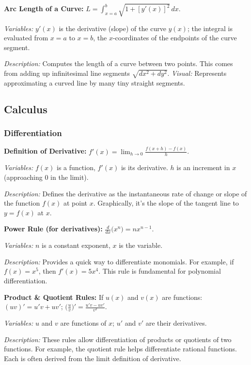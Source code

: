 \documentclass{article}
\begin{document}
\textbf{Arc Length of a Curve:} $L = \displaystyle \int_{x=a}^{b} \sqrt{1 + [y'(x)]^2}\,dx$.

\textit{Variables:} $y'(x)$ is the derivative (slope) of the curve $y(x)$; the integral is evaluated from $x=a$ to $x=b$, the $x$-coordinates of the endpoints of the curve segment.

\textit{Description:} Computes the length of a curve between two points. This comes from adding up infinitesimal line segments $\sqrt{dx^2+dy^2}$. \textit{Visual:} Represents approximating a curved line by many tiny straight segments.

\subsection*{Calculus}

\subsubsection*{Differentiation}

\textbf{Definition of Derivative:} $f'(x) = \displaystyle \lim_{h \to 0} \frac{f(x+h) - f(x)}{h}$.

\textit{Variables:} $f(x)$ is a function, $f'(x)$ is its derivative. $h$ is an increment in $x$ (approaching 0 in the limit).

\textit{Description:} Defines the derivative as the instantaneous rate of change or slope of the function $f(x)$ at point $x$. Graphically, it’s the slope of the tangent line to $y=f(x)$ at $x$.

\textbf{Power Rule (for derivatives):} $\displaystyle \frac{d}{dx}\big(x^n\big) = n x^{n-1}$.

\textit{Variables:} $n$ is a constant exponent, $x$ is the variable.

\textit{Description:} Provides a quick way to differentiate monomials. For example, if $f(x)=x^5$, then $f'(x)=5x^4$. This rule is fundamental for polynomial differentiation.

\textbf{Product \& Quotient Rules:} If $u(x)$ and $v(x)$ are functions: $(uv)' = u'v + uv'$;  $\displaystyle \Big(\frac{u}{v}\Big)' = \frac{u'v - uv'}{v^2}$.

\textit{Variables:} $u$ and $v$ are functions of $x$; $u'$ and $v'$ are their derivatives.

\textit{Description:} These rules allow differentiation of products or quotients of two functions. For example, the quotient rule helps differentiate rational functions. Each is often derived from the limit definition of derivative.
\end{document}
